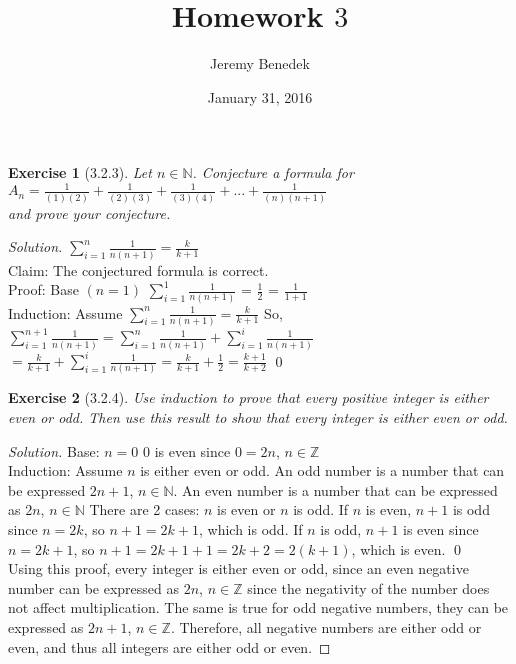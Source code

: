 \documentclass{article}
\title{Homework $3$}
\author{Jeremy Benedek}
\date{January 31, 2016}
\newtheorem*{ex}{Exercise}
\newenvironment{solution}
  {\begin{proof}[Solution]}
  {\renewcommand{\qedsymbol}{}\end{proof}}
\begin{document}
\maketitle

\begin{ex}[3.2.3]
	Let $n \in \mathbb{N}$. Conjecture a formula for \\ $A_n = \frac{1}{(1)(2)} + \frac{1}{(2)(3)} + \frac{1}{(3)(4)} + ... + \frac{1}{(n)(n+1)}$
	\\ and prove your conjecture.
\end{ex}
\begin{solution}
	$\sum\limits_{i=1}^n \frac{1}{n(n+1)} = \frac{k}{k+1}$ \\
	Claim: The conjectured formula is correct.\\
	Proof: Base $(n = 1)$ 
	$\sum\limits_{i=1}^1 \frac{1}{n(n+1)}$ = $\frac{1}{2}$ = $\frac{1}{1+1}$
	\\
	Induction: Assume $\sum\limits_{i=1}^n \frac{1}{n(n+1)} = \frac{k}{k+1}$
	So, $\sum\limits_{i=1}^{n+1} \frac{1}{n(n+1)} = \sum\limits_{i=1}^n \frac{1}{n(n+1)} + \sum\limits_{i=1}^i \frac{1}{n(n+1)}$
	\\ $= \frac{k}{k+1} + \sum\limits_{i=1}^i \frac{1}{n(n+1)} = \frac{k}{k+1} + \frac{1}{2} = \frac {k + 1}{k + 2}$ \qed
\end{solution}

\begin{ex}[3.2.4]
	Use induction to prove that every positive integer is either even or odd. Then use this result to show that every integer
	is either even or odd.
\end{ex}
\begin{solution}
	Base: $n=0$
		0 is even since $0=2n$, $n \in \mathbb{Z}$\\
		Induction: Assume $n$ is either even or odd. An odd number is a number that can be expressed $2n+1$, $n \in \mathbb{N}$. An even number is a number that can be expressed as $2n$, $n \in \mathbb{N}$
		There are 2 cases: $n$ is even or $n$ is odd. If $n$ is even, $n+1$ is odd since $n=2k$, so $n+1 = 2k +1$, which is odd.
		If $n$ is odd, $n+1$ is even since $n=2k+1$, so $n+1 = 2k + 1 + 1 = 2k +2 = 2(k+1)$, which is even. \qed
		\\
		Using this proof, every integer is either even or odd, since an even negative number can be expressed as $2n$, $n \in \mathbb{Z}$ since the negativity of the number does not affect multiplication.
		The same is true for odd negative numbers, they can be expressed as  $2n+1$, $n \in \mathbb{Z}$. Therefore, all negative numbers are either odd or even, and thus all integers are either odd or even.
\end{solution}
\end{document}
